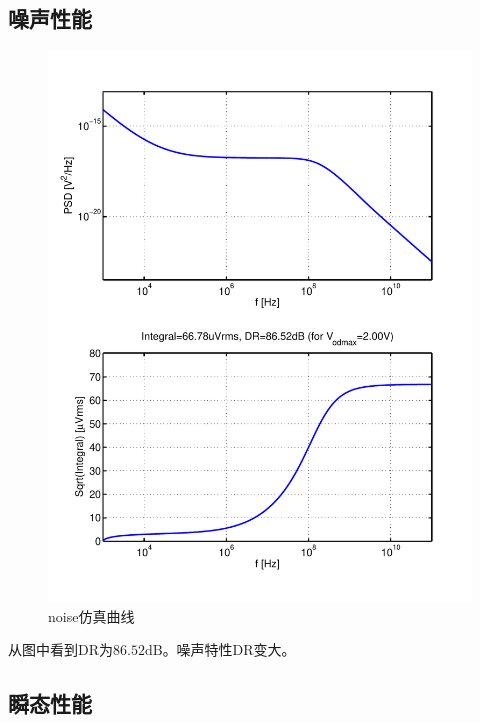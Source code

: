 \documentclass[a4paper]{article}
\newcommand{\udB}{\si{\deci\bel}}
\begin{document}
\subsection{噪声性能}
\begin{figure}[htb]
    \begin{center}
        \includegraphics[width=\textwidth]{fast/noise.pdf}
    \end{center}
    \caption{noise仿真曲线}
    \label{fastnoise}
\end{figure}
从图中看到DR为$86.52\udB$。噪声特性DR变大。
\newpage
\clearpage
\subsection{瞬态性能}
\end{document}
